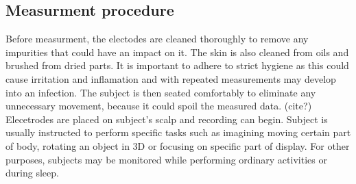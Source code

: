 \subsection{Measurment procedure}
Before measurment, the electodes are cleaned thoroughly to remove any impurities
that could have an impact on it. The skin is also cleaned from oils and brushed
from dried parts. It is important to adhere to strict hygiene as this could
cause irritation and inflamation and with repeated measurements may develop into
an infection.\cite{eegFund} The subject is then seated comfortably to eliminate
any unnecessary movement, because it could spoil the measured data. (cite?)
Elecetrodes are placed on subject's scalp and recording can begin. Subject is
usually instructed to perform specific tasks such as imagining moving certain
part of body, rotating an object in 3D or focusing on specific part of display.
\cite{bcComm} For other purposes, subjects may be monitored while performing
ordinary activities or during sleep.

